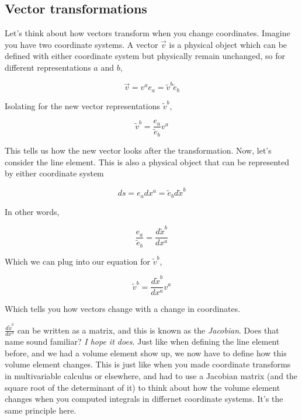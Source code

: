 \documentclass{article}
\begin{document}
\subsection{Vector transformations}
Let's think about how vectors transform when you change coordinates. Imagine you have two coordinate systems. A vector $\vec{v}$ is a physical object which can be defined with either coordinate system but physically remain unchanged, so for different representations $a$ and $b$,

\begin{equation}
    \vec{v} = v^a e_a = \tilde{v}^b \tilde{e}_b
\end{equation}

Isolating for the new vector representations $\tilde{v}^b$,

\begin{equation}
    \tilde{v}^b = \frac{e_a}{\tilde{e}_b} v^a
\end{equation}

This tells us how the new vector looks after the transformation. Now, let's consider the line element. This is also a physical object that can be represented by either coordinate system

\begin{equation}
    ds = e_a dx^a = \tilde{e}_b d\tilde{x}^b
\end{equation}

In other words,

\begin{equation}
    \frac{e_a}{\tilde{e}_b} = \frac{d\tilde{x}^b}{dx^a}
\end{equation}

Which we can plug into our equation for $\tilde{v}^b$,

\begin{equation}
    \tilde{v}^b = \frac{d\tilde{x}^b}{dx^a} v^a
\end{equation}

Which tells you how vectors change with a change in coordinates.

$\frac{d\tilde{x}^b}{dx^a}$ can be written as a matrix, and this is known as the \textit{Jacobian}. Does that name sound familiar? \textit{I hope it does}. Just like when defining the line element before, and we had a volume element show up, we now have to define how this volume element changes. This is just like when you made coordinate transforms in multivariable calculus or elsewhere, and had to use a Jacobian matrix (and the square root of the determinant of it) to think about how the volume element changes when you computed integrals in differnet coordinate systems. It's the same principle here.
\end{document}
